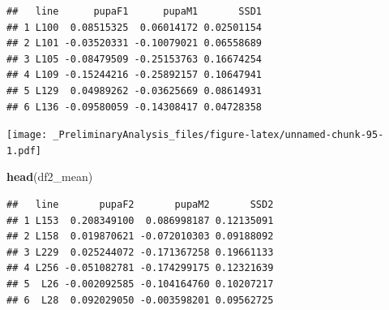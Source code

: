 \documentclass[
]{article}
\newenvironment{Shaded}{\begin{snugshade}}{\end{snugshade}}
\newcommand{\DataTypeTok}[1]{\textcolor[rgb]{0.13,0.29,0.53}{#1}}
\newcommand{\FloatTok}[1]{\textcolor[rgb]{0.00,0.00,0.81}{#1}}
\newcommand{\KeywordTok}[1]{\textcolor[rgb]{0.13,0.29,0.53}{\textbf{#1}}}
\newcommand{\NormalTok}[1]{#1}
\newcommand{\OperatorTok}[1]{\textcolor[rgb]{0.81,0.36,0.00}{\textbf{#1}}}
\newcommand{\StringTok}[1]{\textcolor[rgb]{0.31,0.60,0.02}{#1}}
\begin{document}
\begin{verbatim}
##   line      pupaF1      pupaM1       SSD1
## 1 L100  0.08515325  0.06014172 0.02501154
## 2 L101 -0.03520331 -0.10079021 0.06558689
## 3 L105 -0.08479509 -0.25153763 0.16674254
## 4 L109 -0.15244216 -0.25892157 0.10647941
## 5 L129  0.04989262 -0.03625669 0.08614931
## 6 L136 -0.09580059 -0.14308417 0.04728358
\end{verbatim}

\begin{Shaded}
\end{Shaded}

\texttt{[image: \_PreliminaryAnalysis\_files/figure-latex/unnamed-chunk-95-1.pdf]}

\begin{Shaded}
\begin{Highlighting}[]
\KeywordTok{head}\NormalTok{(df2_mean)}
\end{Highlighting}
\end{Shaded}

\begin{verbatim}
##   line       pupaF2       pupaM2       SSD2
## 1 L153  0.208349100  0.086998187 0.12135091
## 2 L158  0.019870621 -0.072010303 0.09188092
## 3 L229  0.025244072 -0.171367258 0.19661133
## 4 L256 -0.051082781 -0.174299175 0.12321639
## 5  L26 -0.002092585 -0.104164760 0.10207217
## 6  L28  0.092029050 -0.003598201 0.09562725
\end{verbatim}
\end{document}
